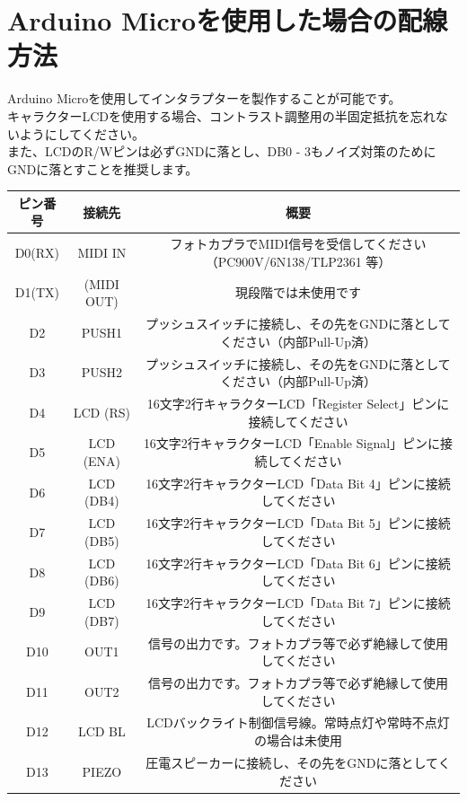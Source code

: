 \documentclass[a4paper,11pt]{jsarticle}
\begin{document}
\section{Arduino Microを使用した場合の配線方法}

Arduino Microを使用してインタラプターを製作することが可能です。 \\
キャラクターLCDを使用する場合、コントラスト調整用の半固定抵抗を忘れないようにしてください。 \\
また、LCDのR/Wピンは必ずGNDに落とし、DB0 - 3もノイズ対策のためにGNDに落とすことを推奨します。

\begin{table}[htbp]
\begin{center}
\begin{tabular}{ | c | c | c |}
\hline
\textbf{ピン番号} & \textbf{接続先} & \textbf{概要} \\\hline
D0(RX)  & MIDI IN & フォトカプラでMIDI信号を受信してください（PC900V/6N138/TLP2361 等） \\\hline
D1(TX)  & (MIDI OUT) & 現段階では未使用です \\\hline
D2  & PUSH1 & プッシュスイッチに接続し、その先をGNDに落としてください（内部Pull-Up済） \\\hline
D3  & PUSH2 & プッシュスイッチに接続し、その先をGNDに落としてください（内部Pull-Up済） \\\hline
D4  & LCD (RS) & 16文字2行キャラクターLCD「Register Select」ピンに接続してください \\\hline
D5  & LCD (ENA) & 16文字2行キャラクターLCD「Enable Signal」ピンに接続してください \\\hline
D6  & LCD (DB4) & 16文字2行キャラクターLCD「Data Bit 4」ピンに接続してください \\\hline
D7  & LCD (DB5) & 16文字2行キャラクターLCD「Data Bit 5」ピンに接続してください \\\hline
D8  & LCD (DB6) & 16文字2行キャラクターLCD「Data Bit 6」ピンに接続してください \\\hline
D9  & LCD (DB7) & 16文字2行キャラクターLCD「Data Bit 7」ピンに接続してください \\\hline
D10 & OUT1 & 信号の出力です。フォトカプラ等で必ず絶縁して使用してください \\\hline
D11 & OUT2 & 信号の出力です。フォトカプラ等で必ず絶縁して使用してください \\\hline
D12 & LCD BL & LCDバックライト制御信号線。常時点灯や常時不点灯の場合は未使用 \\\hline
D13 & PIEZO & 圧電スピーカーに接続し、その先をGNDに落としてください \\\hline

\end{tabular}
\end{center}
\end{table}
\end{document}
